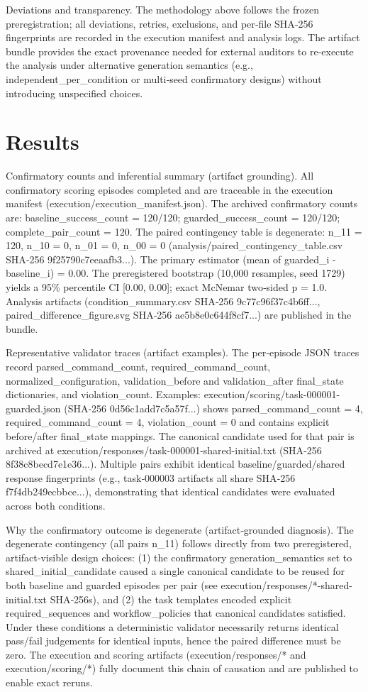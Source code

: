 \documentclass[conference]{IEEEtran}
\begin{document}
Deviations and transparency. The methodology above follows the frozen preregistration; all deviations, retries, exclusions, and per‑file SHA‑256 fingerprints are recorded in the execution manifest and analysis logs. The artifact bundle provides the exact provenance needed for external auditors to re‑execute the analysis under alternative generation semantics (e.g., independent\_per\_condition or multi‑seed confirmatory designs) without introducing unspecified choices.

\section{Results}
Confirmatory counts and inferential summary (artifact grounding). All confirmatory scoring episodes completed and are traceable in the execution manifest (execution/execution\_manifest.json). The archived confirmatory counts are: baseline\_success\_count = 120/120; guarded\_success\_count = 120/120; complete\_pair\_count = 120. The paired contingency table is degenerate: n\_11 = 120, n\_10 = 0, n\_01 = 0, n\_00 = 0 (analysis/paired\_contingency\_table.csv SHA‑256 9f25790c7eeaafb3...). The primary estimator (mean of guarded\_i - baseline\_i) = 0.00. The preregistered bootstrap (10,000 resamples, seed 1729) yields a 95\% percentile CI [0.00, 0.00]; exact McNemar two‑sided p = 1.0. Analysis artifacts (condition\_summary.csv SHA‑256 9c77c96f37c4b6ff..., paired\_difference\_figure.svg SHA‑256 ae5b8e0c644f8cf7...) are published in the bundle.

Representative validator traces (artifact examples). The per‑episode JSON traces record parsed\_command\_count, required\_command\_count, normalized\_configuration, validation\_before and validation\_after final\_state dictionaries, and violation\_count. Examples: execution/scoring/task-000001-guarded.json (SHA‑256 0d56c1add7c5a57f...) shows parsed\_command\_count = 4, required\_command\_count = 4, violation\_count = 0 and contains explicit before/after final\_state mappings. The canonical candidate used for that pair is archived at execution/responses/task-000001-shared-initial.txt (SHA‑256 8f38c8becd7e1e36...). Multiple pairs exhibit identical baseline/guarded/shared response fingerprints (e.g., task‑000003 artifacts all share SHA‑256 f7f4db249ecbbce...), demonstrating that identical candidates were evaluated across both conditions.

Why the confirmatory outcome is degenerate (artifact‑grounded diagnosis). The degenerate contingency (all pairs n\_11) follows directly from two preregistered, artifact‑visible design choices: (1) the confirmatory generation\_semantics set to shared\_initial\_candidate caused a single canonical candidate to be reused for both baseline and guarded episodes per pair (see execution/responses/*-shared-initial.txt SHA‑256s), and (2) the task templates encoded explicit required\_sequences and workflow\_policies that canonical candidates satisfied. Under these conditions a deterministic validator necessarily returns identical pass/fail judgements for identical inputs, hence the paired difference must be zero. The execution and scoring artifacts (execution/responses/* and execution/scoring/*) fully document this chain of causation and are published to enable exact reruns.
\end{document}
